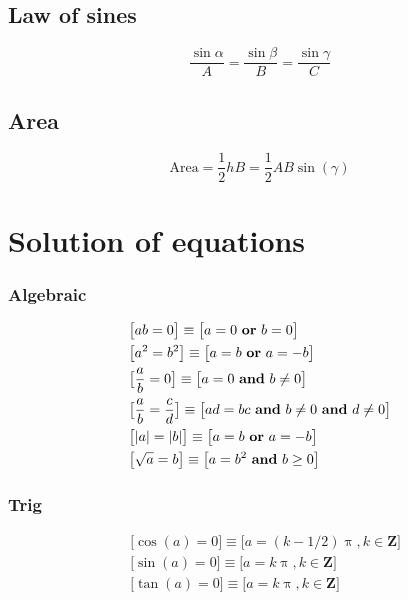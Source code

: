 \documentclass[letterpaper,9pt,fleqn]{extarticle}
\newcommand{\integers}{\mathbf{Z}}
\begin{document}
\begin{multicols*}{3}
\subsection*{Law of sines}
\[
    \frac{\sin{\alpha}}{A} =  \frac{\sin{\beta}}{B} =  \frac{\sin{\gamma}}{C}
\]

\subsection*{Area}

\[
    \mbox{Area} = \frac{1}{2} hB =   \frac{1}{2} A B \sin(\gamma)
\]


\section*{Solution of equations}

\subsubsection*{Algebraic}
\vspace{-0.2in}
\begin{minipage}[c]{0.1666666666667\textwidth}
\begin{align*}
& \big [a b = 0 \big ] \equiv \big [ a = 0 \mbox{ \textbf{or} } b = 0 \big ]\\
& \big [ a^2 = b^2 \big ] \equiv \big [ a = b \mbox{ \textbf{or} } a = -b \big ]\\
&\big [ \frac{a}{b} = 0 \big ] \equiv \big [ a = 0 \mbox{ \textbf{and} } b \neq 0 \big ] \\
&\big [\frac{a}{b} = \frac{c}{d}  \big ] \equiv \big [ad  = bc \mbox{ \textbf{and}  } b \neq 0  \mbox{ \textbf{and}  }  d \neq 0 \big ] \\
&\big [|a| = |b|  \big ] \equiv \big [a =b \mbox{ \textbf{or} } a = -b \big ]\\
&\big [ \sqrt{a}  = b \big ] \equiv \big [a = b^2 \mbox{ \textbf{and}  } b \ge 0 \big ] \\
\end{align*}
\end{minipage}

\subsubsection*{Trig}
\vspace{-0.2in}
\begin{minipage}[c]{0.1666666666667\textwidth}
\begin{align*}
&\big [\cos(a) = 0 \big ]  \equiv  \big [a =  (k - 1/2)  \uppi, k \in \integers \big ]\\
&\big [\sin(a) = 0 \big ]  \equiv  \big [ a = k \uppi, k \in \integers \big ] \\
&\big [\tan(a) = 0 \big ]  \equiv  \big [ a = k \uppi, k \in \integers \big ]
\end{align*}
\end{minipage}

\end{multicols*}
\end{document}
